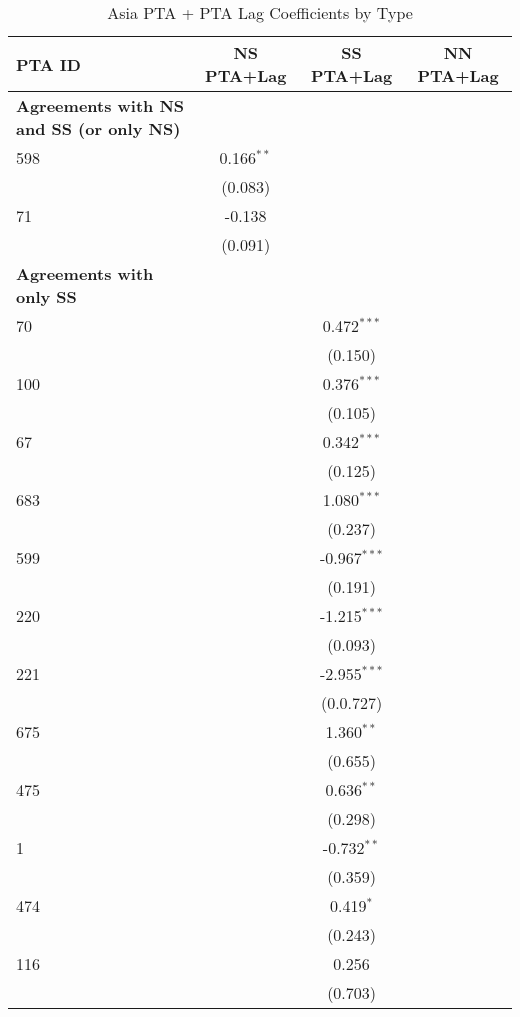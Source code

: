 \begin{table}[htbp]
    \centering
    \caption{Asia PTA + PTA Lag Coefficients by Type}
    \label{tab:asia_pta}
    \begin{adjustbox}{max width=\textwidth}
    \begin{tabular}{lccc}
    \hline
    \textbf{PTA ID} & \textbf{NS PTA+Lag} & \textbf{SS PTA+Lag} & \textbf{NN PTA+Lag} \\
    \hline
    \textbf{Agreements with NS and SS (or only NS)} &  &  &  \\
    \hline
    598 & 0.166$^{\ast\ast}$ &  &  \\
    & (0.083) &  &  \\
    71 & -0.138 &  &  \\
    & (0.091) &  &  \\
    \hline
    \textbf{Agreements with only SS} &  &  &  \\
    \hline
    70 &  & 0.472$^{\ast\ast\ast}$ &  \\
    &  & (0.150) &  \\
    100 &  & 0.376$^{\ast\ast\ast}$ &  \\
    &  & (0.105) &  \\
    67 &  & 0.342$^{\ast\ast\ast}$ &  \\
    &  & (0.125) &  \\
    683 &  & 1.080$^{\ast\ast\ast}$ &  \\
    &  & (0.237) &  \\
    599 &  & -0.967$^{\ast\ast\ast}$ &  \\
    &  & (0.191) &  \\
    220 &  & -1.215$^{\ast\ast\ast}$ &  \\
    &  & (0.093) &  \\
    221 &  & -2.955$^{\ast\ast\ast}$ &  \\
    &  & (0.0.727) &  \\
    675 &  & 1.360$^{\ast\ast}$ &  \\
    &  & (0.655) &  \\
    475 &  & 0.636$^{\ast\ast}$ &  \\
    &  & (0.298) &  \\
    1 &  & -0.732$^{\ast\ast}$ &  \\
    &  & (0.359) &  \\
    474 &  & 0.419$^{\ast}$ &  \\
    &  & (0.243) &  \\
    116 &  & 0.256 &  \\
    &  & (0.703) &  \\

\end{tabular}
\end{adjustbox}
\end{table}
